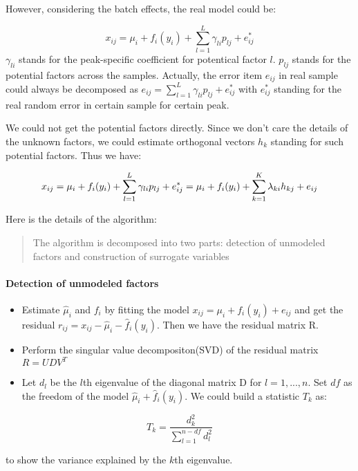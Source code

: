 \documentclass[
]{book}
\begin{document}
However, considering the batch effects, the real model could be:

\[x_{ij} = \mu_i + f_i(y_i) + \sum_{l = 1}^L \gamma_{li}p_{lj} + e_{ij}^*\]
\(\gamma_{li}\) stands for the peak-specific coefficient for potentical factor \(l\). \(p_{lj}\) stands for the potential factors across the samples. Actually, the error item \(e_{ij}\) in real sample could always be decomposed as \(e_{ij} = \sum_{l = 1}^L \gamma_{li}p_{lj} + e_{ij}^*\) with \(e_{ij}^*\) standing for the real random error in certain sample for certain peak.

We could not get the potential factors directly. Since we don't care the details of the unknown factors, we could estimate orthogonal vectors \(h_k\) standing for such potential factors. Thus we have:

\[
x_{ij} = \mu_i + f_i(y_i) + \sum_{l = 1}^L \gamma_{li}p_{lj} + e_{ij}^*\\ 
= \mu_i + f_i(y_i) + \sum_{k = 1}^K \lambda_{ki}h_{kj} + e_{ij}
\]

Here is the details of the algorithm:

\begin{quote}
The algorithm is decomposed into two parts: detection of unmodeled factors and construction of surrogate variables
\end{quote}

\hypertarget{detection-of-unmodeled-factors}{%
\paragraph{Detection of unmodeled factors}\label{detection-of-unmodeled-factors}}

\begin{itemize}
\item
  Estimate \(\hat\mu_i\) and \(f_i\) by fitting the model \(x_{ij} = \mu_i + f_i(y_i) + e_{ij}\) and get the residual \(r_{ij} = x_{ij}-\hat\mu_i - \hat f_i(y_i)\). Then we have the residual matrix R.
\item
  Perform the singular value decompositon(SVD) of the residual matrix \(R = UDV^T\)
\item
  Let \(d_l\) be the \(l\)th eigenvalue of the diagonal matrix D for \(l = 1,...,n\). Set \(df\) as the freedom of the model \(\hat\mu_i + \hat f_i(y_i)\). We could build a statistic \(T_k\) as:
\end{itemize}

\[T_k = \frac{d_k^2}{\sum_{l=1}^{n-df}d_l^2}\]

to show the variance explained by the \(k\)th eigenvalue.
\end{document}
